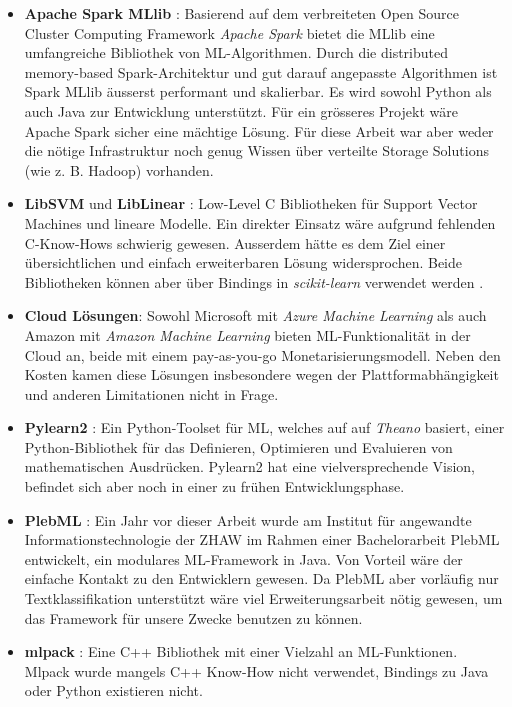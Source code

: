 \documentclass[10pt, a4paper]{article}
\begin{document}
\begin{itemize}
	\item \textbf{Apache Spark MLlib} \cite{apachesparkmllib}: Basierend auf dem verbreiteten Open Source Cluster Computing Framework \textit{Apache Spark} bietet die MLlib eine umfangreiche Bibliothek von \ac{ML}-Algorithmen. Durch die distributed me\-mo\-ry-based Spark-Architektur und gut darauf angepasste Algorithmen ist Spark MLlib äusserst performant und skalierbar. Es wird sowohl Python als auch Java zur Entwicklung unterstützt.
	Für ein grösseres Projekt wäre Apache Spark sicher eine mächtige Lösung. Für diese Arbeit war aber weder die nötige Infrastruktur noch genug Wissen über verteilte Storage Solutions (wie z. B. Hadoop) vorhanden.
	
	\item \textbf{LibSVM} \cite{libsvm} und \textbf{LibLinear} \cite{liblinear}:
	Low-Level C Bibliotheken für Support Vector Machines und lineare Modelle. Ein direkter Einsatz wäre aufgrund fehlenden C-Know-Hows schwierig gewesen. Ausserdem hätte es dem Ziel einer übersichtlichen und einfach erweiterbaren Lösung widersprochen. Beide Bibliotheken können aber über Bindings in \emph{scikit-learn} verwendet werden \cite{libsvminsklearn}.
	
	\item \textbf{Cloud Lösungen}: Sowohl Microsoft mit \textit{Azure Machine Learning} \cite{azureml} als auch Amazon mit \textit{Amazon Machine Learning} \cite{amazonml} bieten ML-Funk\-ti\-o\-na\-li\-tät in der Cloud an, beide mit einem pay-as-you-go Monetarisierungsmodell. Neben den Kosten kamen diese Lösungen insbesondere wegen der Plattformabhängigkeit und anderen Limitationen nicht in Frage.
	
	\item \textbf{Pylearn2} \cite{pylearn2}: Ein Python-Toolset für \ac{ML}, welches auf auf \textit{Theano} \cite{theano} basiert, einer Python-Bibliothek für das Definieren, Optimieren und Evaluieren von mathematischen Ausdrücken. Pylearn2 hat eine vielversprechende Vision, befindet sich aber noch in einer zu frühen Entwicklungsphase.	
	
	\item \textbf{PlebML} \cite{plebml}: Ein Jahr vor dieser Arbeit wurde am Institut für angewandte Informationstechnologie der ZHAW im Rahmen einer Bachelorarbeit PlebML entwickelt, ein modulares ML-Framework in Java. Von Vorteil wäre der einfache Kontakt zu den Entwicklern gewesen. Da PlebML aber vorläufig nur Textklassifikation unterstützt wäre viel Erweiterungsarbeit nötig gewesen, um das Framework für unsere Zwecke benutzen zu können.
	
	\item \textbf{mlpack} \cite{mlpack2013}: Eine C++ Bibliothek mit einer Vielzahl an ML-Funktionen. Mlpack wurde mangels C++ Know-How nicht verwendet, Bindings zu Java oder Python existieren nicht.
\end{itemize}
\end{document}
